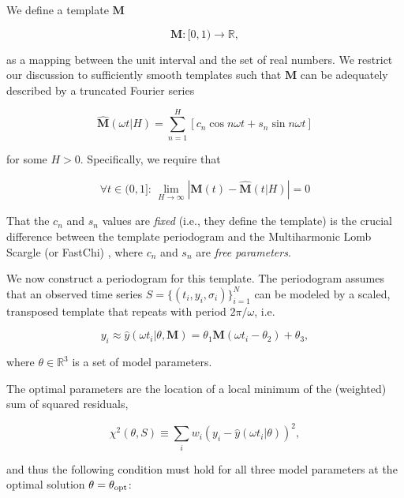 \documentclass[apj]{emulateapj}
\begin{document}
We define a template $\mathbf{M}$

\begin{equation}
    \mathbf{M} : [0, 1)\rightarrow\mathbb{R},
\end{equation}

\noindent as a mapping between the unit interval and the set of real numbers. We
restrict our discussion to sufficiently smooth templates such that
$\mathbf{M}$ can be adequately described by a truncated Fourier series

\begin{equation}
    \hat{\mathbf{M}}(\omega t|H) = \sum_{n=1}^H\left[c_n\cos{n\omega t} + s_n\sin{n\omega t}\right]
\end{equation}

\noindent for some $H > 0$. Specifically, we require that 

\begin{equation}
\begin{split}
   \forall t \in (0, 1]:\, \lim_{H\rightarrow\infty} \left|\mathbf{M}(t) - \hat{\mathbf{M}}(t|H)\right| = 0
\end{split}
\end{equation}

That the $c_n$ and $s_n$ values are \emph{fixed} (i.e., they define 
the template) is the crucial difference between the template periodogram and
the Multiharmonic Lomb Scargle (or FastChi) \citep{Palmer_2009}, where $c_n$ and $s_n$ 
are \emph{free parameters}.

We now construct a periodogram for this template. The periodogram assumes 
that an observed time series $S = \{(t_i, y_i, \sigma_i)\}_{i=1}^N$ can be modeled 
by a scaled, transposed template that repeats with period $2\pi / \omega$, i.e.

\begin{equation}
y_i \approx \hat{y}(\omega t_i|\theta, \mathbf{M}) = \theta_1\mathbf{M}(\omega t_i - \theta_2) + \theta_3,
\end{equation}

\noindent where $\theta\in \mathbb{R}^3$ is a set of model parameters. 

The optimal parameters are the location of a local minimum of the (weighted) sum of 
squared residuals,

\begin{equation}
    \chi^2(\theta, S) \equiv \sum_i w_i (y_i - \hat{y}(\omega t_i|\theta) )^2,
\end{equation}

\noindent and thus the following condition must hold for all three model parameters at 
the optimal solution $\theta=\theta_{\rm opt}$:
\end{document}
